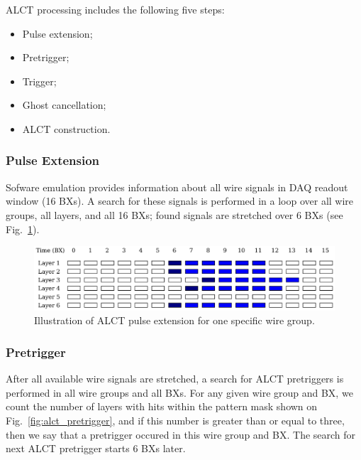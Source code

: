 ALCT processing includes the following five steps:

\begin{itemize}
    \item Pulse extension;
    \item Pretrigger;
    \item Trigger;
    \item Ghost cancellation;
    \item ALCT construction.
\end{itemize}

\subsubsection{Pulse Extension}

Sofware emulation provides information about all wire signals in DAQ readout window (16 BXs). A search for these signals is performed in a loop over all wire groups, all layers, and all 16 BXs; found signals are stretched over 6 BXs (see Fig.~\ref{fig:alct_pulse_extension}).

\begin{figure}[tbh]
        \begin{center}
                \includegraphics[width=0.9\linewidth]{figures/stretched_hits_alct.pdf}
                \caption{Illustration of ALCT pulse extension for one specific wire group.}
                \label{fig:alct_pulse_extension}
        \end{center}
\end{figure}

\subsubsection{Pretrigger}

After all available wire signals are stretched, a search for ALCT pretriggers is performed in all wire groups and all BXs. For any given wire group and BX, we count the number of layers with hits within the pattern mask shown on Fig.~\ref{fig:alct_pretrigger}, and if this number is greater than or equal to three, then we say that a pretrigger occured in this wire group and BX. The search for next ALCT pretrigger starts 6 BXs later.


